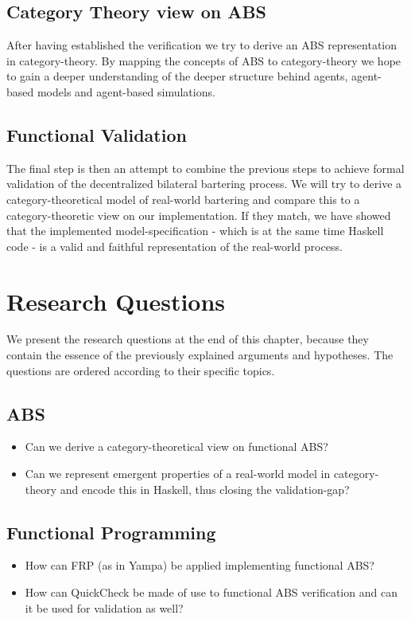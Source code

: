 \subsection{Category Theory view on ABS}
After having established the verification we try to derive an ABS representation in category-theory. By mapping the concepts of ABS to category-theory we hope to gain a deeper understanding of the deeper structure behind agents, agent-based models and agent-based simulations.

\subsection{Functional Validation}
The final step is then an attempt to combine the previous steps to achieve formal validation of the decentralized bilateral bartering process. We will try to derive a category-theoretical model of real-world bartering and compare this to a category-theoretic view on our implementation. If they match, we have showed that the implemented model-specification - which is at the same time Haskell code - is a valid and faithful representation of the real-world process.

\section{Research Questions}
We present the research questions at the end of this chapter, because they contain the essence of the previously explained arguments and hypotheses. The questions are ordered according to their specific topics.

\subsection{ABS}
\begin{itemize}
	\item Can we derive a category-theoretical view on functional ABS? 
	\item Can we represent emergent properties of a real-world model in category-theory and encode this in Haskell, thus closing the validation-gap?
\end{itemize}

\subsection{Functional Programming}
\begin{itemize}
	\item How can FRP (as in Yampa) be applied implementing functional ABS?
	\item How can QuickCheck be made of use to functional ABS verification and can it be used for validation as well?
\end{itemize}

